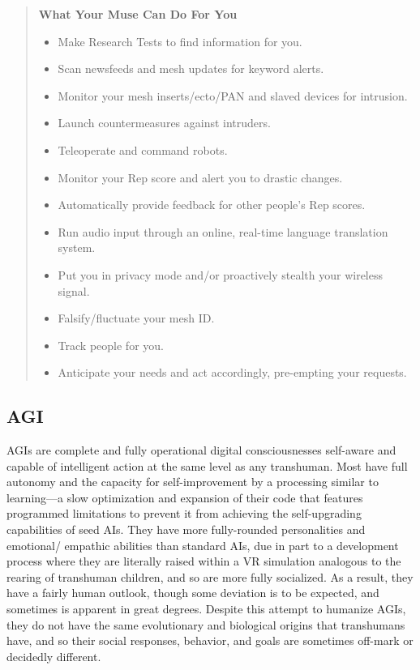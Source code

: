 \begin{quotation} \textbf{What Your Muse Can Do For You} \begin{itemize} \item Make Research Tests to find information for you. \item Scan newsfeeds and mesh updates for keyword alerts. \item Monitor your mesh inserts/ecto/PAN and slaved devices for intrusion. \item Launch countermeasures against intruders. \item Teleoperate and command robots. \item Monitor your Rep score and alert you to drastic changes. \item Automatically provide feedback for other people’s Rep scores. \item Run audio input through an online, real-time language translation system. \item Put you in privacy mode and/or proactively stealth your wireless signal. \item Falsify/fluctuate your mesh ID. \item Track people for you. \item Anticipate your needs and act accordingly, pre-empting your requests. \end{itemize} \end{quotation} 

\subsection{AGI} 

AGIs are complete and fully operational digital consciousnesses self-aware and capable of intelligent action at the same level as any transhuman. Most have full autonomy and the capacity for self-improvement by a processing similar to learning—a slow optimization and expansion of their code that features programmed limitations to prevent it from achieving the self-upgrading capabilities of seed AIs. They have more fully-rounded personalities and emotional/ empathic abilities than standard AIs, due in part to a development process where they are literally raised within a VR simulation analogous to the rearing of transhuman children, and so are more fully socialized. As a result, they have a fairly human outlook, though some deviation is to be expected, and sometimes is apparent in great degrees. Despite this attempt to humanize AGIs, they do not have the same evolutionary and biological origins that transhumans have, and so their social responses, behavior, and goals are sometimes off-mark or decidedly different. 


